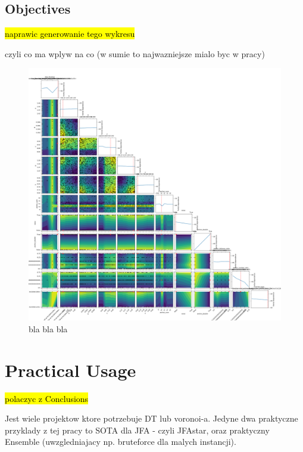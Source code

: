\documentclass{article}
\begin{document}
\subsection{Objectives} %

\hl{naprawic generowanie tego wykresu}

czyli co ma wplyw na co (w sumie to najwazniejsze mialo byc w pracy)

\begin{figure}[H]
	\centering
	\includegraphics[width=\linewidth]{../figures/raport}
	\caption{bla bla bla}
	\label{fig:abstract}
\end{figure}

\section{Practical Usage} %

\hl{polaczyc z Conclusions}

Jest wiele projektow ktore potrzebuje DT lub voronoi-a. Jedyne dwa praktyczne
przyklady z tej pracy to SOTA dla JFA - czyli JFAstar, oraz praktyczny Ensemble
(uwzgledniajacy np. bruteforce dla malych instancji).
\end{document}
